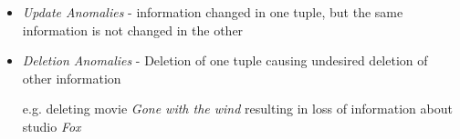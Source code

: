 \documentclass[12pt]{article}
\begin{document}
\begin{enumerate}[1.]
\begin{enumerate}[a)]
\begin{enumerate}[a)]
\begin{itemize}
\begin{itemize}
\begin{itemize}
                        \item \textit{Update Anomalies} - information changed in one
                        tuple, but the same information is not changed in the other

                        \item \textit{Deletion Anomalies} - Deletion of one tuple causing
                        undesired deletion of other information

                        \bigskip

                        e.g. deleting movie \textit{Gone with the wind} resulting
                        in loss of information about studio \textit{Fox}


                    \end{itemize}
                \end{itemize}
            \end{itemize}
        \end{enumerate}

    \end{enumerate}

\end{enumerate}
\end{document}
